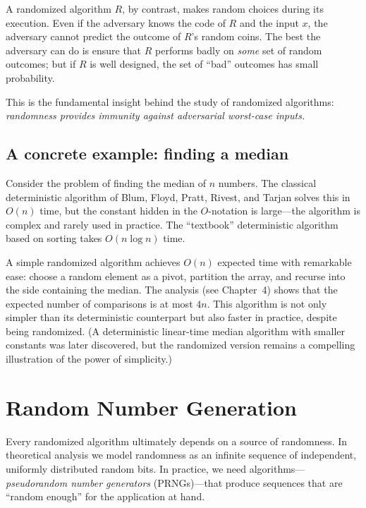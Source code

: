 \documentclass[twoside,12pt]{book}
\theoremstyle{plain}
\theoremstyle{definition}
\theoremstyle{remark}
\begin{document}
A randomized algorithm $R$, by contrast, makes random choices during its
execution. Even if the adversary knows the code of $R$ and the input $x$,
the adversary cannot predict the outcome of $R$'s random coins. The best
the adversary can do is ensure that $R$ performs badly on \emph{some} set
of random outcomes; but if $R$ is well designed, the set of ``bad''
outcomes has small probability.

This is the fundamental insight behind the study of randomized algorithms:
\emph{randomness provides immunity against adversarial worst-case inputs.}

\subsection{A concrete example: finding a median}

Consider the problem of finding the median of $n$ numbers. The classical
deterministic algorithm of Blum, Floyd, Pratt, Rivest, and Tarjan solves
this in $O(n)$ time, but the constant hidden in the $O$-notation is
large---the algorithm is complex and rarely used in practice. The
``textbook'' deterministic algorithm based on sorting takes $O(n \log n)$
time.

A simple randomized algorithm achieves $O(n)$ expected time with
remarkable ease: choose a random element as a pivot, partition the array,
and recurse into the side containing the median. The analysis (see
Chapter~4) shows that the expected number of comparisons is at most $4n$.
This algorithm is not only simpler than its deterministic counterpart but
also faster in practice, despite being randomized. (A deterministic
linear-time median algorithm with smaller constants was later discovered,
but the randomized version remains a compelling illustration of the power
of simplicity.)

\section{Random Number Generation}
\label{sec:rng}

Every randomized algorithm ultimately depends on a source of randomness.
In theoretical analysis we model randomness as an infinite sequence of
independent, uniformly distributed random bits. In practice, we need
algorithms---\emph{pseudorandom number generators} (PRNGs)---that produce
sequences that are ``random enough'' for the application at hand.
\end{document}
